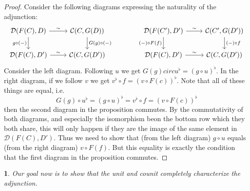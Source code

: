 \documentclass[12pt]{article}
\newtheorem{para}[theorem]{}
\begin{document}
\begin{proof}
	Consider the following diagrams expressing the naturality of the adjunction:
	\begin{equation*}
\begin{tikzcd}
{\mathcal{D}(F(C), D)} \arrow[r, "\sim"] \arrow[d, "g\circ (-)"'] & {\mathcal{C}(C, G(D))} \arrow[d, "G(g)\circ (-)"] &  & {\mathcal{D}(F(C'), D')} \arrow[r, "\sim"] \arrow[d, "(-)\circ F(f)"'] & {\mathcal{C}(C', G(D'))} \arrow[d, "(-)\circ f"] \\
{\mathcal{D}(F(C), D')} \arrow[r, "\sim"]                         & {\mathcal{C}(C, G(D'))}                           &  & {\mathcal{D}(F(C), D')} \arrow[r, "\sim"]                              & {\mathcal{C}(C, G(D'))}                         
\end{tikzcd}
	\end{equation*}
	Consider the left diagram. Following $u$ we get $G(g)circ u^\flat = (g\circ u)^\flat$. In the right diagram, if we follow $v$ we get $v^\flat\circ f = (v\circ F(c))^\flat$. Note that all of these things are equal, i.e. 
	\begin{equation*}
		G(g)\circ u^\flat = (g\circ u)^\flat = v^\flat\circ f = (v\circ F(c))^\flat
	\end{equation*}
	then the second diagram in the proposition commutes. By the commutativity of both diagrams, and especially the isomorphism beon the bottom row which they both share, this will only happen if they are the image of the same element in $\mathcal{D}(F(C), D')$. Thus we need to show that (from the left diagram) $g\circ u$ equals (from the right diagram) $v\circ F(f)$. But this equality is exactly the condition that the first diagram in the proposition commutes.  
\end{proof}

\begin{para}
	Our goal now is to show that the unit and counit completely characterize the adjunction.
\end{para}
\end{document}
